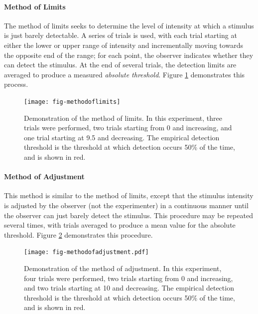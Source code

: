 \documentclass[11pt]{isuthesis}\usepackage[]{graphicx}\usepackage[]{color}
\begin{document}
\paragraph{Method of Limits} The method of limits seeks to determine the level of intensity at which a stimulus is just barely detectable. A series of trials is used, with each trial starting at either the lower or upper range of intensity and incrementally moving towards the opposite end of the range; for each point, the observer indicates whether they can detect the stimulus. At the end of several trials, the detection limits are averaged to produce a measured \emph{absolute threshold}. Figure \ref{fig:methodoflimits} demonstrates this process. 



\begin{figure}[htbp]\centering
\texttt{[image: fig-methodoflimits]}
\caption[The Method of Limits]{Demonstration of the method of limits. In this experiment, three trials were performed, two trials starting from 0 and increasing, and one trial starting at 9.5 and decreasing. The empirical detection threshold is the threshold at which detection occurs 50\% of the time, and is shown in red. }\label{fig:methodoflimits}
\end{figure}

\paragraph{Method of Adjustment} This method is similar to the method of limits, except that the stimulus intensity is adjusted by the observer (not the experimenter) in a continuous manner until the observer can just barely detect the stimulus. This procedure may be repeated several times, with trials averaged to produce a mean value for the absolute threshold. Figure \ref{fig:methodofadjustment} demonstrates this procedure. 


\begin{figure}[htbp]\centering
\texttt{[image: fig-methodofadjustment.pdf]}
\caption[The Method of Adjustment]{Demonstration of the method of adjustment. In this experiment, four trials were performed, two trials starting from 0 and increasing, and two trials starting at 10 and decreasing. The empirical detection threshold is the threshold at which detection occurs 50\% of the time, and is shown in red. \label{fig:methodofadjustment}}
\end{figure}
\end{document}
